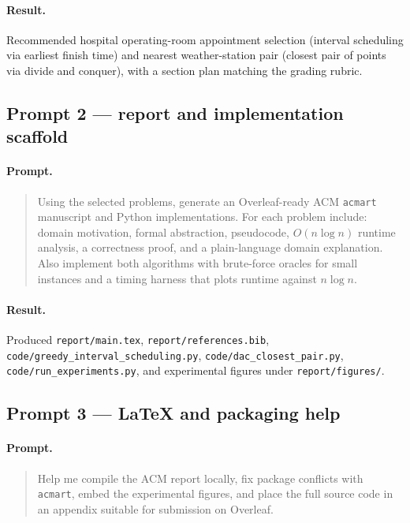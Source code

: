 \documentclass[sigconf,review=false]{acmart}
\theoremstyle{definition}
\begin{document}
\paragraph{Result.}
Recommended hospital operating-room appointment selection (interval
scheduling via earliest finish time) and nearest weather-station pair
(closest pair of points via divide and conquer), with a section plan
matching the grading rubric.

\subsection{Prompt 2 --- report and implementation scaffold}
\paragraph{Prompt.}
\begin{quote}
Using the selected problems, generate an Overleaf-ready ACM
\texttt{acmart} manuscript and Python implementations. For each problem
include: domain motivation, formal abstraction, pseudocode, $O(n\log n)$
runtime analysis, a correctness proof, and a plain-language domain
explanation. Also implement both algorithms with brute-force oracles for
small instances and a timing harness that plots runtime against
$n\log n$.
\end{quote}

\paragraph{Result.}
Produced \texttt{report/main.tex}, \texttt{report/references.bib},
\texttt{code/greedy\_interval\_scheduling.py},
\texttt{code/dac\_closest\_pair.py}, \texttt{code/run\_experiments.py},
and experimental figures under \texttt{report/figures/}.

\subsection{Prompt 3 --- \LaTeX{} and packaging help}
\paragraph{Prompt.}
\begin{quote}
Help me compile the ACM report locally, fix package conflicts with
\texttt{acmart}, embed the experimental figures, and place the full
source code in an appendix suitable for submission on Overleaf.
\end{quote}
\end{document}
